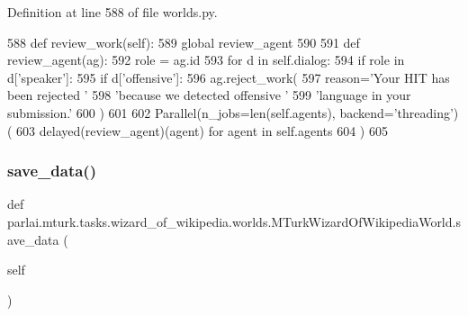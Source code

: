 Definition at line 588 of file worlds.\+py.


\begin{DoxyCode}
588     \textcolor{keyword}{def }review\_work(self):
589         \textcolor{keyword}{global} review\_agent
590 
591         \textcolor{keyword}{def }review\_agent(ag):
592             role = ag.id
593             \textcolor{keywordflow}{for} d \textcolor{keywordflow}{in} self.dialog:
594                 \textcolor{keywordflow}{if} role \textcolor{keywordflow}{in} d[\textcolor{stringliteral}{'speaker'}]:
595                     \textcolor{keywordflow}{if} d[\textcolor{stringliteral}{'offensive'}]:
596                         ag.reject\_work(
597                             reason=\textcolor{stringliteral}{'Your HIT has been rejected '}
598                             \textcolor{stringliteral}{'because we detected offensive '}
599                             \textcolor{stringliteral}{'language in your submission.'}
600                         )
601 
602         Parallel(n\_jobs=len(self.agents), backend=\textcolor{stringliteral}{'threading'})(
603             delayed(review\_agent)(agent) \textcolor{keywordflow}{for} agent \textcolor{keywordflow}{in} self.agents
604         )
605 
\end{DoxyCode}
\mbox{\label{classparlai_1_1mturk_1_1tasks_1_1wizard__of__wikipedia_1_1worlds_1_1MTurkWizardOfWikipediaWorld_a2cc512e7aab47494715260bebda33ca8}} 
\subsubsection{\texorpdfstring{save\+\_\+data()}{save\_data()}}
{\footnotesize\ttfamily def parlai.\+mturk.\+tasks.\+wizard\+\_\+of\+\_\+wikipedia.\+worlds.\+M\+Turk\+Wizard\+Of\+Wikipedia\+World.\+save\+\_\+data (\begin{DoxyParamCaption}\item[{}]{self }\end{DoxyParamCaption})}



